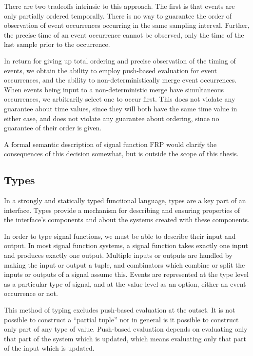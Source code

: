 \documentclass[draft]{llncs}
\begin{document}
There are two tradeoffs intrinsic to this approach. The first is that events are only partially ordered
temporally. There is no way to guarantee the order of observation of event occurrences occurring in the
same sampling interval. Further, the precise time of an event occurrence cannot be observed, only the 
time of the last sample prior to the occurrence.

In return for giving up total ordering and precise observation of the timing of events, we obtain the
ability to employ push-based evaluation for event occurrences, and the ability to non-deterministically
merge event occurrences. When events being input to a non-deterministic merge have simultaneous occurrences,
we arbitrarily select one to occur first. This does not violate any guarantee about time values, since
they will both have the same time value in either case, and does not violate any guarantee about ordering,
since no guarantee of their order is given.

A formal semantic description of signal function FRP would clarify the consequences of this decision somewhat,
but is outside the scope of this thesis.

\subsection{Types}
\label{subsection:System_Design_and_Interface-Types}

In a strongly and statically typed functional language, types are a key part of
an interface. Types provide a mechanism for describing and ensuring properties
of the interface's components and about the systems created with these
components. 

In order to type signal functions, we must be able to describe their input and
output. In most signal function systems, a signal function takes exactly one
input and produces exactly one output. Multiple inputs or outputs are handled
by making the input or output a tuple, and combinators which combine or split
the inputs or outputs of a signal assume this. Events are represented at the
type level as a particular type of signal, and at the value level as an option,
either an event occurrence or not.

This method of typing excludes push-based evaluation at the outset.
It is not possible to construct a ``partial tuple'' nor in general is it
possible to construct only part of any type of value. Push-based evaluation
depends on evaluating only that part of the system which is updated, which means
evaluating only that part of the input which is updated.
\end{document}
